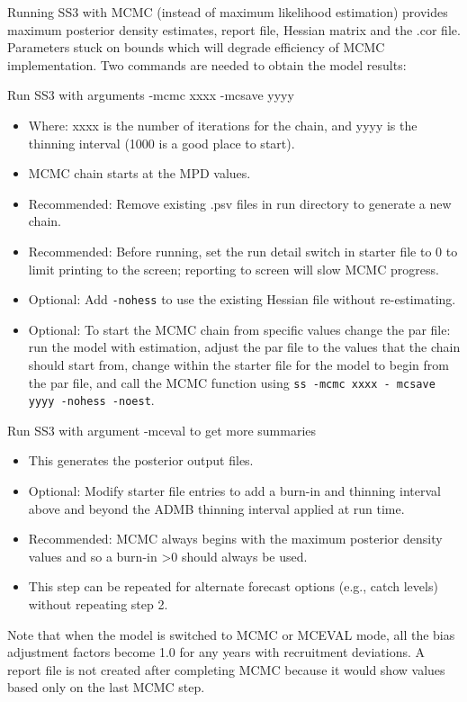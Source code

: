  Running SS3 with MCMC (instead of maximum likelihood estimation) provides maximum posterior density estimates, report file, Hessian matrix and the .cor file. Parameters stuck on bounds which will degrade efficiency of MCMC implementation. Two commands are needed to obtain the model results:
 
\noindent Run SS3 with arguments -mcmc xxxx -mcsave yyyy
 \begin{itemize}
 	\item Where: xxxx is the number of iterations for the chain, and yyyy is the thinning interval (1000 is a good place to start).
 	\item MCMC chain starts at the MPD values.
 	\item Recommended: Remove existing .psv files in run directory to generate a new chain.
 	\item Recommended: Before running, set the run detail switch in starter file to 0 to limit printing to the screen; reporting to screen will slow MCMC progress.
 	\item Optional: Add \texttt{-nohess} to use the existing Hessian file without re-estimating.
 	\item Optional: To start the MCMC chain from specific values change the par file: run the model with estimation, adjust the par file to the values that the chain should start from, change within the starter file for the model to begin from the par file, and call the MCMC function using \texttt{ss -mcmc xxxx - mcsave yyyy -nohess -noest}.
 \end{itemize}
	
\noindent Run SS3 with argument -mceval to get more summaries
\begin{itemize}
	\item This generates the posterior output files.
	\item Optional: Modify starter file entries to add a burn-in and thinning interval above and beyond the ADMB thinning interval applied at run time.
	\item Recommended: MCMC always begins with the maximum posterior density values and so a burn-in >0 should always be used.
	\item This step can be repeated for alternate forecast options (e.g., catch levels) without repeating step 2.
\end{itemize}

Note that when the model is switched to MCMC or MCEVAL mode, all the bias adjustment factors become 1.0 for any years with recruitment deviations. A report file is not created after completing MCMC because it would show values based only on the last MCMC step.

\pagebreak